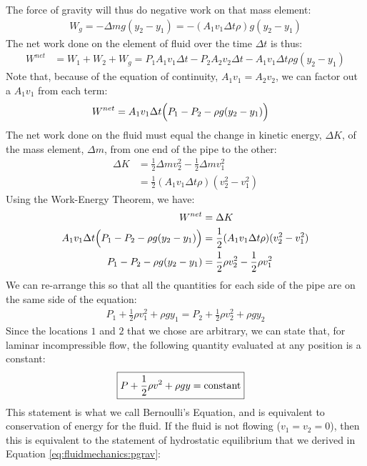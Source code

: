 {{The force of gravity will thus do negative work on that mass element:
\begin{align*}
W_g = -\Delta m g (y_2-y_1) = -(A_1 v_1 \Delta t \rho) g (y_2-y_1) 
\end{align*}
The net work done on the element of fluid over the time $\Delta t$ is thus:
\begin{align*}
W^{net} &= W_1+W_2+W_g = P_1A_1v_1 \Delta t - P_2A_2v_2 \Delta t -A_1 v_1 \Delta t \rho g (y_2-y_1) 
\end{align*}
Note that, because of the equation of continuity, $A_1v_1 = A_2 v_2$, we can factor out a $A_1v_1$ from each term:
\begin{align*}
W^{net} &=A_1v_1 \Delta t \Bigl(P_1- P_2 - \rho g (y_2-y_1)\Bigr) 
\end{align*}
The net work done on the fluid must equal the change in kinetic energy, $\Delta K$, of the mass element, $\Delta m$, from one end of the pipe to the other:
\begin{align*}
\Delta K &= \frac{1}{2}\Delta m v_2^2 - \frac{1}{2}\Delta m v_1^2\\
&=\frac{1}{2}( A_1 v_1 \Delta t \rho) (v_2^2 - v_1^2)
\end{align*}
Using the Work-Energy Theorem, we have:
\begin{align*}
W^{net} &=\Delta K\\
A_1v_1 \Delta t \Bigl(P_1- P_2 - \rho g (y_2-y_1)\Bigr) &= \frac{1}{2}( A_1 v_1 \Delta t \rho) (v_2^2 - v_1^2)\\
P_1 - P_2 - \rho g (y_2-y_1)&= \frac{1}{2}\rho v_2^2 - \frac{1}{2}\rho v_1^2
\end{align*}
We can re-arrange this so that all the quantities for each side of the pipe are on the same side of the equation:
\begin{align*}
P_1 +\frac{1}{2}\rho v_1^2+ \rho g y_1= P_2 + \frac{1}{2}\rho v_2^2 + \rho g y_2
\end{align*}
Since the locations $1$ and $2$ that we chose are arbitrary, we can state that, for laminar incompressible flow, the following quantity evaluated at any position is a constant:
\begin{align}
\Aboxed{P +\frac{1}{2}\rho v^2+ \rho g y=\text{constant}}
\end{align}
This statement is what we call Bernoulli's Equation, and is equivalent to conservation of energy for the fluid. If the fluid is not flowing ($v_1=v_2=0$), then this is equivalent to the statement of hydrostatic equilibrium that we derived in Equation \ref{eq:fluidmechanics:pgrav}:
}}
